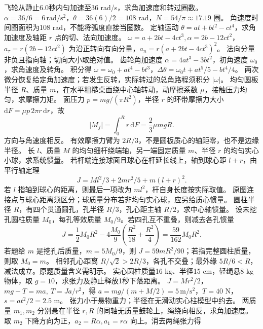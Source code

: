 \problemtext 飞轮从静止6.0秒内匀加速至36 rad/s，求角加速度和转过圈数。
\workings $\alpha=36/6=6\,\mathrm{rad/s^2}$，$\theta=36(6)/2=108$ rad，$N=54/\pi\approx17.19$ 圈。
\crosscheck 角速度时间图面积为108 rad，不能将弧度直接当圈数。
\problemtext 定轴运动 $\theta=at+bt^2-ct^4$，求角加速度及轴距 $r$ 点的切、法向加速度。
\workings $\omega=a+2bt-4ct^3,\alpha=2b-12ct^2$，$a_\tau=r(2b-12ct^2)$ 为沿正转向有向分量，$a_n=r(a+2bt-4ct^3)^2$。
\crosscheck 法向分量非负且指向轴；切向大小取绝对值。
\problemtext 齿轮角加速度 $\alpha=4at^3-3bt^2$，初角速度 $\omega_0$，求角速度及转角。
\workings 积分得 $\omega=\omega_0+at^4-bt^3$，$\Delta\theta=\omega_0t+at^5/5-bt^4/4$。
\crosscheck 两次微分恢复给定角加速度；若发生反转，实际转过的总角路程须积分 $|\omega|$。
\problemtext 均匀圆板半径 $R$、质量 $m$，在水平粗糙桌面绕中心轴转动，动摩擦系数 $\mu$，接触压力均匀，求摩擦力矩。
\workings 面压力 $p=mg/(\pi R^2)$，半径 $r$ 的环带摩擦力大小 $\mathrm dF=\mu p\,2\pi r\,\mathrm dr$，故
\[
|M_f|=\int_0^R r\,\mathrm dF=\frac23\mu mgR.
\]
方向与角速度相反。
\crosscheck 有效摩擦力臂为 $2R/3$，不是圆板质心的轴距零，也不是边缘半径。
\problemtext 长 $l$、质量 $M$ 的均匀细杆绕端轴，另一端固定质量 $m$、半径 $r$ 的均匀实心小球，求系统惯量。
\workings 若杆端连接球面且球心在杆延长线上，轴到球心距 $l+r$，由平行轴定理
\[
J=Ml^2/3+2mr^2/5+m(l+r)^2.
\]
若 $l$ 指轴到球心的距离，则最后一项改为 $ml^2$，杆自身长度按实际取值。
\crosscheck 原图连接点与球心距离须区分；球质量分布若非均匀实心球，应另给质心惯量。
\problemtext 圆柱半径 $R$，有四个贯通圆孔，孔半径 $R/3$，孔心距主轴 $R/2$，求中心轴惯量。
\workings 设未挖孔圆柱质量 $M_0$，每孔等效质量 $M_0/9$。若四孔互不重叠，则减去各孔惯量
\[
J=\frac12 M_0R^2-4\frac{M_0}{9}\left(\frac{R^2}{18}+\frac{R^2}{4}\right)=\frac{59}{162}M_0R^2.
\]
若题给 $m$ 是挖孔后质量，$m=5M_0/9$，则 $J=59mR^2/90$；若指完整圆柱质量，则取 $M_0=m$。
\crosscheck 相邻孔心距离 $R/\sqrt2>2R/3$，各孔不交叠；最外缘 $5R/6<R$，减法成立。原题质量含义需明示。
\problemtext 实心圆柱质量16 kg、半径15 cm，轻绳悬8 kg物体，取 $g=10$，求张力及静止释放1秒下落距离。
\workings $J=Mr^2/2$，$mg-T=ma,\ T=Ja/r^2$，得 $a=mg/(m+M/2)=5\,\mathrm{m/s^2}$，$T=40$ N，$s=at^2/2=2.5$ m。
\crosscheck 张力小于悬物重力；半径在无滑动实心柱模型中约去。
\problemtext 两质量 $m_1,m_2$ 分别悬在半径 $r,R$ 的同轴无质量鼓轮上，绳绕向相反，求角加速度。
\workings 取 $m_2$ 下降方向为正，$a_2=R\alpha,a_1=r\alpha$ 向上。消去两绳张力得
